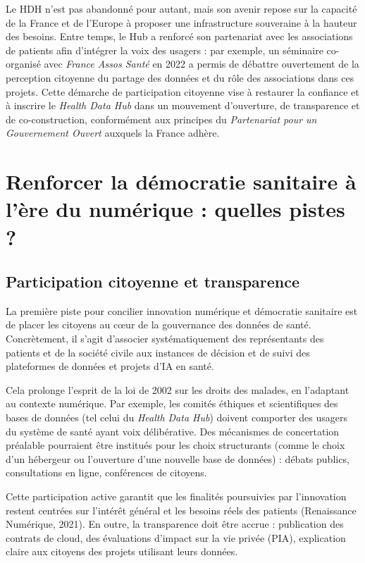 \documentclass[10pt,a4paper]{article} %
\begin{document}
Le HDH n’est pas abandonné pour autant, mais son avenir repose sur la capacité de la France et de l’Europe à proposer une infrastructure souveraine à la hauteur des besoins. Entre temps, le Hub a renforcé son partenariat avec les associations de patients afin d’intégrer la voix des usagers : par exemple, un séminaire co-organisé avec \textit{France Assos Santé} en 2022 a permis de débattre ouvertement de la perception citoyenne du partage des données et du rôle des associations dans ces projets. Cette démarche de participation citoyenne vise à restaurer la confiance et à inscrire le \textit{Health Data Hub} dans un mouvement d’ouverture, de transparence et de co-construction, conformément aux principes du \textit{Partenariat pour un Gouvernement Ouvert} auxquels la France adhère.


\section{Renforcer la démocratie sanitaire à l’ère du numérique : quelles pistes ?}

\subsection{Participation citoyenne et transparence}

La première piste pour concilier innovation numérique et démocratie sanitaire est de placer les citoyens au cœur de la gouvernance des données de santé. Concrètement, il s’agit d’associer systématiquement des représentants des patients et de la société civile aux instances de décision et de suivi des plateformes de données et projets d’IA en santé.

Cela prolonge l’esprit de la loi de 2002 sur les droits des malades, en l’adaptant au contexte numérique. Par exemple, les comités éthiques et scientifiques des bases de données (tel celui du \textit{Health Data Hub}) doivent comporter des usagers du système de santé ayant voix délibérative. Des mécanismes de concertation préalable pourraient être institués pour les choix structurants (comme le choix d’un hébergeur ou l’ouverture d’une nouvelle base de données) : débats publics, consultations en ligne, conférences de citoyens.

Cette participation active garantit que les finalités poursuivies par l’innovation restent centrées sur l’intérêt général et les besoins réels des patients (Renaissance Numérique, 2021). En outre, la transparence doit être accrue : publication des contrats de cloud, des évaluations d’impact sur la vie privée (PIA), explication claire aux citoyens des projets utilisant leurs données.
\end{document}
